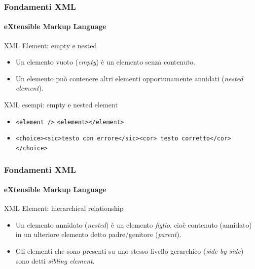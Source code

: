 \begin{frame}
    \frametitle{Fondamenti XML}
    \framesubtitle{eXtensible Markup Language}
    \addtocounter{nframe}{1}

	\begin{block}{XML Element: empty e nested}
		\begin{itemize}
			\item Un elemento vuoto (\textit{empty}) è un elemento senza contenuto.
			\item Un elemento può contenere altri elementi opportunamente annidati (\textit{nested element}).
		\end{itemize}
	\end{block}

	\begin{block}{XML esempi: empty e nested element}
		\begin{itemize}
			\item \texttt{<element />} \texttt{<element></element>}
			\item \texttt{<choice><sic>testo con errore</sic><cor> testo corretto</cor></choice>}
		\end{itemize}
		
	\end{block}
	
\end{frame}



\begin{frame}
    \frametitle{Fondamenti XML}
    \framesubtitle{eXtensible Markup Language}
    \addtocounter{nframe}{1}

	\begin{block}{XML Element: hierarchical relationship}
		\begin{itemize}
			\item Un elemento annidato (\textit{nested}) è un elemento \textit{figlio}, cioè contenuto (annidato) in un ulteriore elemento detto padre/genitore (\textit{parent}).
			\item Gli elementi che sono presenti su uno stesso livello gerarchico (\textit{side by side}) sono detti \textit{sibling element}.
		\end{itemize}
	\end{block}

\end{frame}

